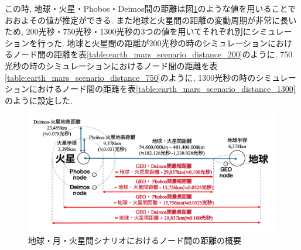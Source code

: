 この時, 地球・火星・Phobos・Deimos間の距離は図\ref{fig:distance_earth_mars}のような値を用いることでおおよその値が推定ができる. 
また地球と火星間の距離の変動周期が非常に長いため, 200光秒・750光秒・1300光秒の3つの値を用いてそれぞれ別にシミュレーションを行った.
地球と火星間の距離が200光秒の時のシミュレーションにおけるノード間の距離を表\ref{table:earth_mars_scenario_distance_200}のように, 
750光秒の時のシミュレーションにおけるノード間の距離を表\ref{table:earth_mars_scenario_distance_750}のように, 
1300光秒の時のシミュレーションにおけるノード間の距離を表\ref{table:earth_mars_scenario_distance_1300}のように設定した.


\begin{figure}[tbh]
    \centering
    \includegraphics[width=0.7\textheight]{img/simulation_params_earth_mars.pdf}
    \caption{地球・月・火星間シナリオにおけるノード間の距離の概要}
    \label{fig:distance_earth_mars}
    \begin{minipage}{\textwidth}
        \raggedright
        \fontsize{10.5pt}\selectfont
    \end{minipage}
\end{figure}

